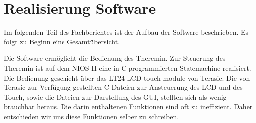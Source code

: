 \clearpage
\section{Realisierung Software}\label{sec:Realisierung_Software}
Im folgenden Teil des Fachberichtes ist der Aufbau der Software beschrieben. Es folgt zu Beginn eine Gesamtübersicht.

Die Software ermöglicht die Bedienung des Theremin. Zur Steuerung des Theremin ist auf dem NIOS II eine in C programmierten Statemachine realisiert. Die Bedienung geschieht über das LT24 LCD touch module von Terasic. Die von Terasic zur Verfügung gestellten C Dateien zur Ansteuerung des LCD und des Touch, sowie die Dateien zur Darstellung des GUI, stellten sich als wenig brauchbar heraus. Die darin enthaltenen Funktionen sind oft zu ineffizient. Daher entschieden wir uns diese Funktionen selber zu schreiben.